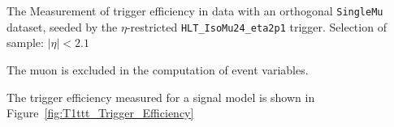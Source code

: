 


The Measurement of trigger efficiency in data with an orthogonal \texttt{SingleMu} dataset, 
seeded by the $\eta$-restricted \verb!HLT_IsoMu24_eta2p1! trigger.
Selection of sample: $|\eta| < 2.1$

The muon is excluded in the computation of event variables.



The trigger efficiency measured for a signal model is shown in Figure~\ref{fig:T1ttt_Trigger_Efficiency}


